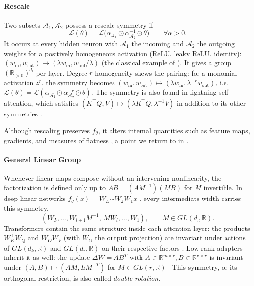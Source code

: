 \documentclass[mathematics,review,submit,moreauthors]{Definitions/mdpi}
\begin{document}
\paragraph{Rescale}
Two subsets $\mathcal{A}_1,\mathcal{A}_2$ possess a rescale symmetry if \citep{kunin2020}
\begin{equation*}
    \mathcal{L}(\theta)=\mathcal{L}\big(\alpha_{\mathcal{A}_1}\odot\alpha_{\mathcal{A}_2}^{-1}\odot\theta\big) \qquad \forall\alpha>0.
\end{equation*}
It occurs at every hidden neuron with $\mathcal{A}_1$ the incoming and $\mathcal{A}_2$ the outgoing weights for a positively homogeneous activation ($\mathrm{ReLU}$, leaky $\mathrm{ReLU}$, identity): $(w_{\mathrm{in}},w_{\mathrm{out}})\mapsto(\lambda w_{\mathrm{in}},w_{\mathrm{out}}/\lambda)$ (the classical example of ).
It gives a group $(\mathbb{R}_{>0})^{d_l}$ per layer.
Degree-$r$ homogeneity skews the pairing: for a monomial activation $z^r$, the symmetry becomes $(w_{\mathrm{in}},w_{\mathrm{out}})\mapsto(\lambda w_{\mathrm{in}},\lambda^{-r}w_{\mathrm{out}})$, i.e.\ $\mathcal{L}(\theta)=\mathcal{L}(\alpha_{\mathcal{A}_1}\odot\alpha_{\mathcal{A}_2}^{-r}\odot\theta)$.
The symmetry is also found in lightning self-attention, which satisfies $(K^{\top}Q,V)\mapsto(\lambda K^{\top}Q,\lambda^{-1}V)$ in addition to its other symmetries \citep{henry2025}.

Although rescaling preserves $f_\theta$, it alters internal quantities such as feature maps, gradients, and measures of flatness \citep{armenta2021b}, a point we return to in .

\paragraph{General Linear Group}
Whenever linear maps compose without an intervening nonlinearity, the factorization is defined only up to $AB=(AM^{-1})(MB)$ for $M$ invertible.
In deep linear networks $f_\theta(x)=W_L\cdots W_2W_1x$ \citep{saxe2014piclr2}, every intermediate width carries this symmetry,
\begin{equation*}
    (W_L,\dots,W_{l+1}M^{-1},\,MW_l,\dots,W_1), \qquad M\in GL(d_l,\mathbb{R}).
\end{equation*}
Transformers contain the same structure inside each attention layer: the products $W_K^{\top}W_Q$ and $W_OW_V$ (with $W_O$ the output projection) are invariant under actions of $GL(d_k,\mathbb{R})$ and $GL(d_v,\mathbb{R})$ on their respective factors \citep{kobayashi2024anips}.
Low-rank adapters \citep[LoRA,][]{hu2021} inherit it as well: the update $\Delta W=AB^T$ with $A\in \mathbb R^{m\times r}, B\in \mathbb R^{n\times r}$ is invariant under $(A, B)\mapsto(AM, BM^{-T})$ for $M\in GL(r,\mathbb{R})$ \citep{yen2025iclr}.
This symmetry, or its orthogonal restriction, is also called \emph{double rotation}.
\end{document}
